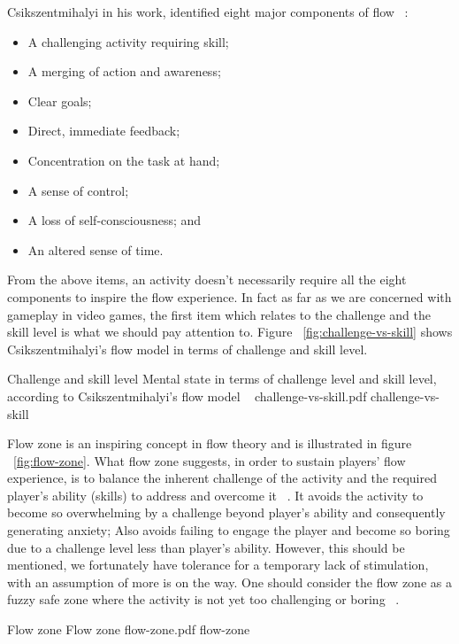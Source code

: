 Csikszentmihalyi in his work, identified eight major components of flow ~\cite{csikszentmihalyi1990flow}:

\begin{itemize}
\item A challenging activity requiring skill;
\item A merging of action and awareness;
\item Clear goals;
\item Direct, immediate feedback;
\item Concentration on the task at hand; 
\item A sense of control;
\item A loss of self-consciousness; and
\item An altered sense of time. 
\end{itemize}

From the above items, an activity doesn't necessarily require all the eight components to inspire the flow experience. In fact as far as we are concerned with gameplay in video games, the first item which relates to the challenge and the skill level is what we should pay attention to. Figure ~\ref{fig:challenge-vs-skill} shows Csikszentmihalyi's flow model in terms of challenge and skill level.

\img
{Challenge and skill level}
{Mental state in terms of challenge level and skill level, according to Csikszentmihalyi's flow model ~\cite{csikszentmihalyi1997finding}}
{challenge-vs-skill.pdf}
{challenge-vs-skill}

Flow zone is an inspiring concept in flow theory and is illustrated in figure ~\ref{fig:flow-zone}. What flow zone suggests, in order to sustain players' flow experience, is to balance the inherent challenge of the activity and the required player's ability (skills) to address and overcome it ~\cite{chen2007flow}. It avoids the activity to become so overwhelming by a challenge beyond player's ability and consequently generating anxiety; Also avoids failing to engage the player and become so boring due to a challenge level less than player's ability. However, this should be mentioned, we fortunately have tolerance for a temporary lack of stimulation, with an assumption of more is on the way. One should consider the flow zone as a fuzzy safe zone where the activity is not yet too challenging or boring ~\cite{csikszentmihalyi1990flow}.

\img
{Flow zone}
{Flow zone}
{flow-zone.pdf}
{flow-zone}


